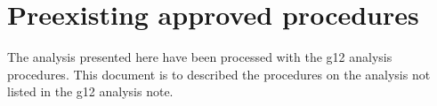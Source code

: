 \documentclass[10pt,a4paper]{report}
\author{Michael C. Kunkel}
\begin{document}
	\section{Preexisting approved procedures}
	The analysis presented here have been processed with the g12 analysis procedures. This document is to described the procedures on the analysis not listed in the g12 analysis note.
\end{document}
